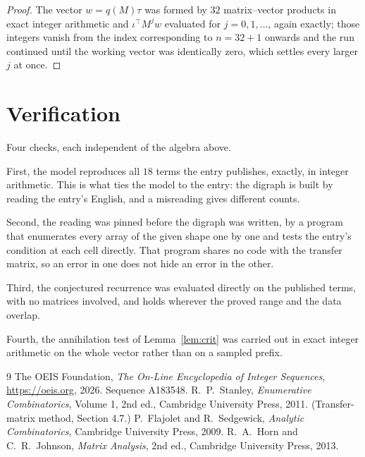\documentclass[11pt,a4paper]{article}
\theoremstyle{plain}
\theoremstyle{definition}
\begin{document}
\begin{proof}
The vector $w=q(M)\tau$ was formed by $32$ matrix--vector products in exact integer
arithmetic and $\iota^{\!\top}M^{j}w$ evaluated for $j=0,1,\dots$, again exactly; those
integers vanish from the index corresponding to $n=32+1$ onwards and the run continued
until the working vector was identically zero, which settles every larger $j$ at once.
\end{proof}

\section{Verification}

Four checks, each independent of the algebra above.

First, the model reproduces all $18$ terms the entry publishes, exactly, in integer
arithmetic. This is what ties the model to the entry: the digraph is built by reading the
entry's English, and a misreading gives different counts.

Second, the reading was pinned before the digraph was written, by a program that enumerates
every array of the given shape one by one and tests the entry's condition at each cell
directly. That program shares no code with the transfer matrix, so an error in one does not
hide an error in the other.

Third, the conjectured recurrence was evaluated directly on the published terms, with no
matrices involved, and holds wherever the proved range and the data overlap.

Fourth, the annihilation test of Lemma~\ref{lem:crit} was carried out in exact integer
arithmetic on the whole vector rather than on a sampled prefix.

\begin{thebibliography}{9}
 The OEIS Foundation, \emph{The On-Line Encyclopedia of Integer
Sequences}, \url{https://oeis.org}, 2026. Sequence A183548.
 R.~P.~Stanley, \emph{Enumerative Combinatorics}, Volume 1, 2nd ed.,
Cambridge University Press, 2011. (Transfer-matrix method, Section 4.7.)
 P.~Flajolet and R.~Sedgewick, \emph{Analytic Combinatorics}, Cambridge
University Press, 2009.
 R.~A.~Horn and C.~R.~Johnson, \emph{Matrix Analysis}, 2nd ed., Cambridge
University Press, 2013.
\end{thebibliography}
\end{document}
